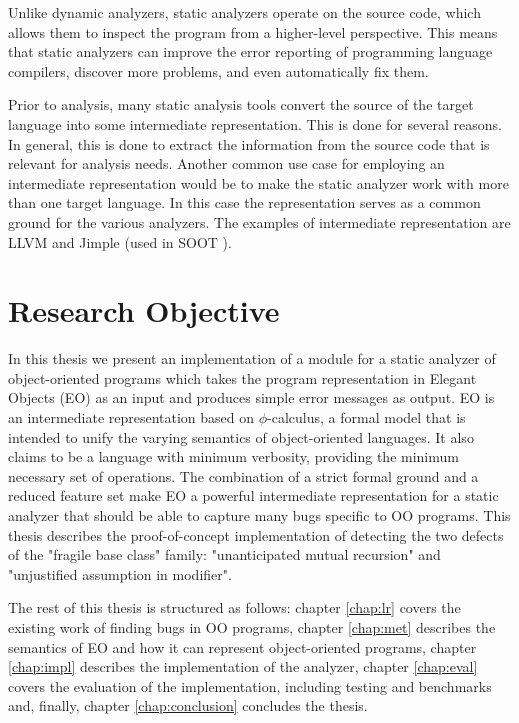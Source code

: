 Unlike dynamic analyzers, static analyzers operate on the source code, which allows them to inspect the program from a higher-level perspective. This means that static analyzers can improve the error reporting of programming language compilers, discover more problems, and  even automatically fix them.

Prior to analysis, many static analysis tools convert the source of the target language into some intermediate representation. This is done for several reasons. In general, this is done to extract the information from the source code that is relevant for analysis needs. Another common use case for employing an intermediate representation would be to
make the static analyzer work with more than one target language. In this case the representation serves as a common ground for the various analyzers. The examples of  intermediate representation are LLVM \cite{llvm} and Jimple \cite{vallee1998jimple} (used in SOOT \cite{vallee2010soot}).

\section{Research Objective}

In this thesis we present an implementation of a module for a static analyzer of object-oriented programs which takes the program representation in Elegant Objects (EO) \cite{eolang} as an input and produces simple error messages as output. EO is an intermediate representation based on $\phi$-calculus, a formal model that is intended to unify the varying semantics of object-oriented languages. It also claims to be a language with minimum verbosity, providing the minimum necessary set of operations. The combination of a strict formal ground and a reduced feature set make EO a powerful intermediate representation for a static analyzer that should be able to capture many bugs specific to OO programs. This thesis describes the proof-of-concept implementation of detecting the two defects of the "fragile base class" \cite{fragilebaseclass} family: "unanticipated mutual recursion" and "unjustified assumption in modifier".

The rest of this thesis is structured as follows: chapter \ref{chap:lr} covers the existing work of finding bugs in OO programs, chapter \ref{chap:met} describes the semantics of EO and how it can represent object-oriented programs, chapter \ref{chap:impl} describes the implementation of the analyzer, chapter \ref{chap:eval} covers the evaluation of the implementation, including testing and benchmarks and, finally, chapter \ref{chap:conclusion} concludes the thesis.
